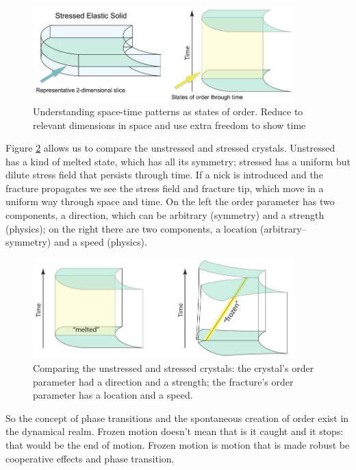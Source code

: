 \documentclass[]{article}
\begin{document}
\begin{figure}[H]
	\caption[Understanding space-time patterns
	as states of order]{Understanding space-time patterns
		as states of order. Reduce to relevant
		dimensions in space and use extra freedom to show
		time}\label{fig:stressed-solid}
	\includegraphics[width=0.9\textwidth]{stressed-solid}
\end{figure}

Figure \ref{fig:stressed-solid-comparison} allows us to compare the unstressed and stressed crystals. Unstressed has a kind of melted state, which has all its symmetry; stressed has a uniform but dilute stress field that persists through time. If a nick is introduced and the fracture propagates we see the stress field and fracture tip, which move in a uniform way through space and time. On the left the order parameter has two components, a direction, which can be arbitrary (symmetry) and a strength (physics); on the right there are two components, a location (arbitrary--symmetry) and a speed (physics).
\begin{figure}[H]
	\caption[Comparing the unstressed and stressed crystals]{Comparing the unstressed and stressed crystals: the crystal’s order parameter had a
		direction and a strength; the fracture’s order parameter has a
		location and a speed.}\label{fig:stressed-solid-comparison}
	\includegraphics[width=0.9\textwidth]{stressed-solid-comparison}
\end{figure}

So the concept of phase transitions and the spontaneous creation of order exist in the dynamical realm. Frozen motion doesn't mean that is it caught and it stops: that would be the end of motion. Frozen motion is motion that is made robust be cooperative effects and phase transition.
\end{document}
